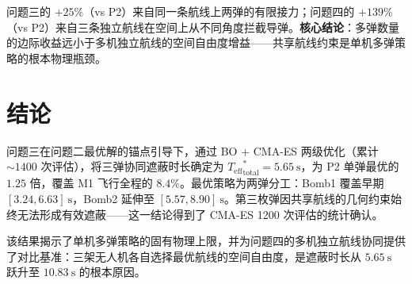 \documentclass[12pt,a4paper]{ctexart}
\newcommand{\Teff}{T_{\text{eff}}}
\begin{document}
问题三的 $+25\%$（vs P2）来自同一条航线上两弹的有限接力；问题四的 $+139\%$（vs P2）来自三条独立航线在空间上从不同角度拦截导弹。\textbf{核心结论}：多弹数量的边际收益远小于多机独立航线的空间自由度增益——共享航线约束是单机多弹策略的根本物理瓶颈。

\section{结论}

问题三在问题二最优解的锚点引导下，通过 BO + CMA-ES 两级优化（累计 $\sim 1400$ 次评估），将三弹协同遮蔽时长确定为 ${\Teff}_{\text{total}}^* = 5.65\ \mathrm{s}$，为 P2 单弹最优的 $1.25$ 倍，覆盖 M1 飞行全程的 $8.4\%$。最优策略为两弹分工：Bomb1 覆盖早期 $[3.24, 6.63]\ \mathrm{s}$，Bomb2 延伸至 $[5.57, 8.90]\ \mathrm{s}$。第三枚弹因共享航线的几何约束始终无法形成有效遮蔽——这一结论得到了 CMA-ES 1200 次评估的统计确认。

该结果揭示了单机多弹策略的固有物理上限，并为问题四的多机独立航线协同提供了对比基准：三架无人机各自选择最优航线的空间自由度，是遮蔽时长从 $5.65\ \mathrm{s}$ 跃升至 $10.83\ \mathrm{s}$ 的根本原因。
\end{document}
